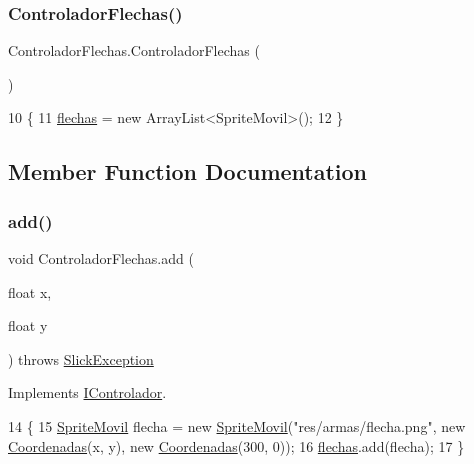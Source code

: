 \subsubsection{\texorpdfstring{Controlador\+Flechas()}{ControladorFlechas()}}
{\footnotesize\ttfamily Controlador\+Flechas.\+Controlador\+Flechas (\begin{DoxyParamCaption}{ }\end{DoxyParamCaption})\hspace{0.3cm}{\ttfamily [inline]}}


\begin{DoxyCode}
10                                \{
11         \mbox{\hyperlink{class_controlador_flechas_a1214f7644979b0d063796611a3965201}{flechas}} = \textcolor{keyword}{new} ArrayList<SpriteMovil>();
12     \}
\end{DoxyCode}


\subsection{Member Function Documentation}
\mbox{\label{class_controlador_flechas_a0f13f2616d99a402e2b5fe2385dd208f}} 
\subsubsection{\texorpdfstring{add()}{add()}}
{\footnotesize\ttfamily void Controlador\+Flechas.\+add (\begin{DoxyParamCaption}\item[{float}]{x,  }\item[{float}]{y }\end{DoxyParamCaption}) throws \mbox{\hyperlink{classorg_1_1newdawn_1_1slick_1_1_slick_exception}{Slick\+Exception}}\hspace{0.3cm}{\ttfamily [inline]}}



Implements \mbox{\hyperlink{interface_i_controlador_af6e795781b2eead3e435cbbdd61bde41}{I\+Controlador}}.


\begin{DoxyCode}
14                                                            \{
15         \mbox{\hyperlink{class_sprite_movil}{SpriteMovil}} flecha = \textcolor{keyword}{new} \mbox{\hyperlink{class_sprite_movil}{SpriteMovil}}(\textcolor{stringliteral}{"res/armas/flecha.png"}, \textcolor{keyword}{new} 
      \mbox{\hyperlink{class_coordenadas}{Coordenadas}}(x, y), \textcolor{keyword}{new} \mbox{\hyperlink{class_coordenadas}{Coordenadas}}(300, 0));
16         \mbox{\hyperlink{class_controlador_flechas_a1214f7644979b0d063796611a3965201}{flechas}}.add(flecha);
17     \}
\end{DoxyCode}
\mbox{\label{class_controlador_flechas_abc0b5e9945efd4696c827fecf42503df}} 
